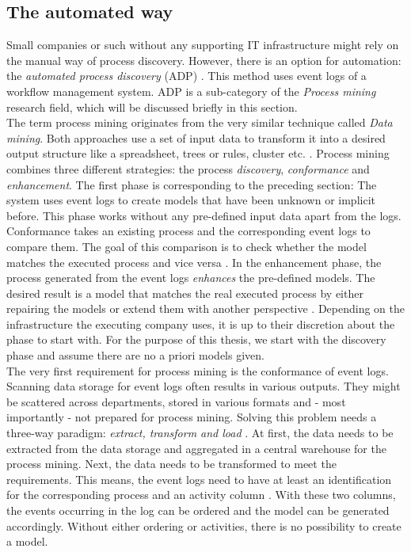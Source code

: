 \subsection{The automated way}
Small companies or such without any supporting IT infrastructure might rely on the manual way of process discovery. However, there is an option for automation: the \textit{automated process discovery} (ADP) \cite{Dumas2013}. This method uses event logs of a workflow management system. ADP is a sub-category of the \textit{Process mining} research field, which will be discussed briefly in this section.\\
The term process mining originates from the very similar technique called \textit{Data mining}. Both approaches use a set of input data to transform it into a desired output structure like a spreadsheet, trees or rules, cluster etc. \cite{Aalst2011}. Process mining combines three different strategies: the process \textit{discovery}, \textit{conformance} and \textit{enhancement}. The first phase is corresponding to the preceding section: The system uses event logs to create models that have been unknown or implicit before. This phase works without any pre-defined input data apart from the logs. \\
Conformance takes an existing process and the corresponding event logs to compare them. The goal of this comparison is to check whether the model matches the executed process and vice versa \cite{Aalst2011}. 
In the enhancement phase, the process generated from the event logs \textit{enhances} the pre-defined models. The desired result is a model that matches the real executed process by either repairing the models or extend them with another perspective \cite{Aalst2011}. 
Depending on the infrastructure the executing company uses, it is up to their discretion about the phase to start with. For the purpose of this thesis, we start with the discovery phase and assume there are no a priori models given. \\
The very first requirement for process mining is the conformance of event logs. Scanning data storage for event logs often results in various outputs. They might be scattered across departments, stored in various formats and - most importantly - not prepared for process mining. Solving this problem needs a three-way paradigm: \textit{extract, transform and load} \cite{Aalst2011}. At first, the data needs to be extracted from the data storage and aggregated in a central warehouse for the process mining. Next, the data needs to be transformed to meet the requirements. This means, the event logs need to have at least an identification for the corresponding process and an activity column \cite{Aalst2011}. With these two columns, the events occurring in the log can be ordered and the model can be generated accordingly. Without either ordering or activities, there is no possibility to create a model. \\

